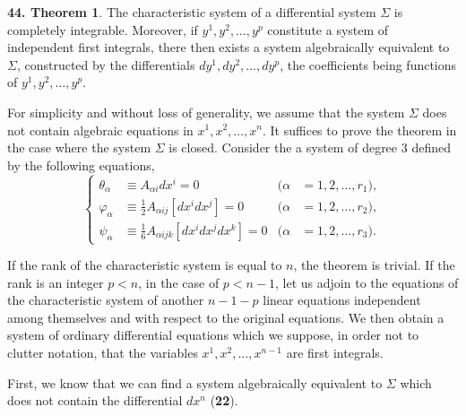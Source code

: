 \documentclass[leqno,11pt]{book}
\numberwithin{equation}{chapter}
\theoremstyle{shape1}
\theoremstyle{shape0}
\theoremstyle{shape2}
\theoremstyle{definition}
\begin{document}
\vspace{12pt}\addtocounter{frenchsec}{1}
\newtheorem*{thm44}{\hspace{15pt}\textbf{44.} Theorem}

\begin{thm44}
  The characteristic system of a differential system $\Sigma$ is completely integrable. Moreover, if $y^{1},y^{2},\dots,y^{p}$ constitute a system of independent first integrals, there then exists a system algebraically equivalent to $\Sigma$, constructed by the differentials $dy^{1},dy^{2},\dots,dy^{p}$, the coefficients being functions of $y^{1},y^{2},\dots,y^{p}$.
\end{thm44}

For simplicity and without loss of generality, we assume that the system $\Sigma$ does not contain algebraic equations in $x^{1},x^{2},\dots,x^{n}$. It suffices to prove the theorem in the case where the system $\Sigma$ is closed.  Consider the a system of degree $3$ defined by the following equations,
\begin{equation}
  \label{eq:3.7}
  \left\{
    \begin{aligned}
      \theta_{\alpha}&\equiv A_{\alpha i}dx^{i}=0&(\alpha&=1,2,\dots,r_{1}),\\
      \varphi_{\alpha}&\equiv \frac{1}{2}A_{\alpha ij}[dx^{i}dx^{j}]=0&(\alpha&=1,2,\dots,r_{2}),\\
      \psi_{\alpha}&\equiv \frac{1}{6}A_{\alpha ijk}[dx^{i}dx^{j}dx^{k}]=0&(\alpha&=1,2,\dots,r_{3}).
    \end{aligned}
  \right.
\end{equation}

If the rank of the characteristic system is equal to $n$, the theorem is trivial. If the rank is an integer $p<n$, in the case of $p<n-1$, let us adjoin to the equations of the characteristic system of another $n-1-p$ linear equations independent among themselves and with respect to the original equations. We then obtain a system of ordinary differential equations which we suppose, in order not to clutter notation, that the variables $x^{1},x^{2},\dots,x^{n-1}$ are first integrals.

First, we know that we can find a system algebraically equivalent to $\Sigma$ which does not contain the differential $dx^{n}$ (\textsection\textbf{22}).
\end{document}
